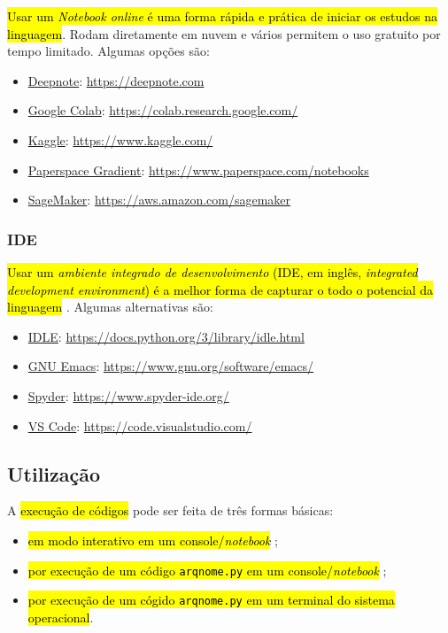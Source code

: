 \documentclass[12pt]{article}
\begin{document}
\hl{Usar um \emph{\textit{Notebook} {\python} \textit{online}} é uma forma rápida e prática de iniciar os estudos na linguagem}. Rodam diretamente em nuvem e vários permitem o uso gratuito por tempo limitado. Algumas opções são:
\begin{itemize}
\item \href{https://deepnote.com}{Deepnote}: \url{https://deepnote.com}
\item \href{https://colab.research.google.com/}{Google Colab}: \url{https://colab.research.google.com/}
\item \href{https://www.kaggle.com/}{Kaggle}: \url{https://www.kaggle.com/}
\item \href{https://www.paperspace.com/notebooks}{Paperspace Gradient}: \url{https://www.paperspace.com/notebooks}
\item \href{https://aws.amazon.com/sagemaker/}{SageMaker}: \url{https://aws.amazon.com/sagemaker}
\end{itemize}

\subsubsection{IDE}

\hl{Usar um \emph{ambiente integrado de desenvolvimento} (IDE, em inglês, \textit{integrated development environment}) é a melhor forma de capturar o todo o potencial da linguagem {\python}}. Algumas alternativas são:
\begin{itemize}
\item \href{https://docs.python.org/3/library/idle.html}{IDLE}: \url{https://docs.python.org/3/library/idle.html}
\item \href{https://www.gnu.org/software/emacs/download.html}{GNU Emacs}: \url{https://www.gnu.org/software/emacs/}
\item \href{https://www.spyder-ide.org/}{Spyder}: \url{https://www.spyder-ide.org/}
\item \href{https://code.visualstudio.com/}{VS Code}: \url{https://code.visualstudio.com/}
\end{itemize}

\subsection{Utilização}

A \hl{execução de códigos {\python}} pode ser feita de três formas básicas:
\begin{itemize}
\item \hl{em modo interativo em um console/\textit{notebook} {\python}};
\item \hl{por execução de um código \texttt{arqnome.py} em um console/\textit{notebook} {\python}};
\item \hl{por execução de um cógido \texttt{arqnome.py} em um terminal do sistema operacional}.
\end{itemize}
\end{document}
